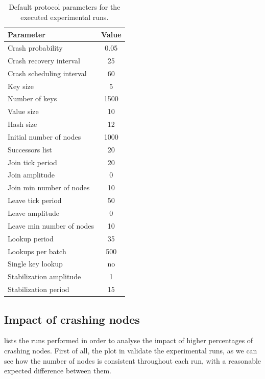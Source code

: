 \documentclass[11pt,twocolumn,letterpaper]{article}
\begin{document}
	\begin{table}[!ht]
		\caption{Default protocol parameters for the executed experimental runs.}
		\label{tab:default_params}
		\centering
		\begin{tabular}{lc}
			\hline
			\textbf{Parameter} & \textbf{Value} \\
			\hline
			Crash probability & 0.05\\
			\hline
			Crash recovery interval & 25\\
			\hline
			Crash scheduling interval & 60\\
			\hline
			Key size & 5 \\
			\hline
			Number of keys & 1500\\
			\hline
			Value size & 10\\
			\hline
			Hash size & 12\\
			\hline
			Initial number of nodes & 1000\\
			\hline
			Successors list & 20\\
			\hline
			Join tick period & 20\\
			\hline
			Join amplitude & 0\\
			\hline
			Join min number of nodes & 10\\
			\hline
			Leave tick period & 50\\
			\hline
			Leave amplitude & 0\\
			\hline
			Leave min number of nodes & 10\\
			\hline
			Lookup period & 35\\
			\hline
			Lookups per batch & 500\\
			\hline
			Single key lookup & no\\
			\hline
			Stabilization amplitude & 1\\
			\hline
			Stabilization period & 15\\
			\hline
		\end{tabular}
	\end{table}
	
	\subsection{Impact of crashing nodes}
	\label{subsec:crash_analysis}
		 lists the runs performed in order to analyse the impact of higher percentages of crashing nodes. First of all, the plot in  validate the experimental runs, as we can see how the number of nodes is consistent throughout each run, with a reasonable expected difference between them. 
						
\end{document}
